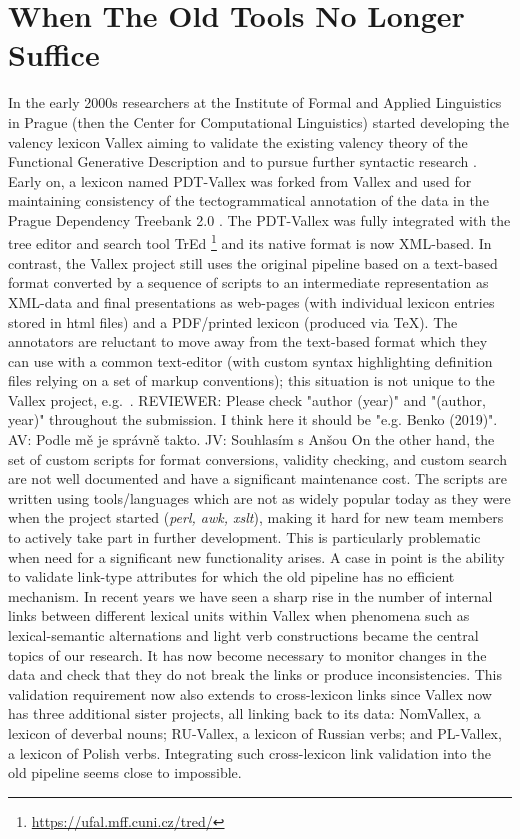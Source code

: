 \documentclass[10pt, a4paper]{article}
\newcommand{\av}[1]{{\color{ansa} AV: #1}}
\newcommand{\jv}[1]{{\color{svlinks} JV: #1}}
\newcommand{\rrr}[1]{{\color{red} REVIEWER: #1}}
\begin{document}
\section{When The Old Tools No Longer Suffice}\label{sec:history}
In the early 2000s researchers at the Institute of Formal and Applied Linguistics in Prague
(then the Center for Computational Linguistics) started developing the valency lexicon Vallex aiming to
validate the existing valency theory of the Functional Generative Description \cite{Panevova74verbal,Panevova75verbal,Panevova80formy,PanevovaSkoumalova92surface} and to pursue
further syntactic research \cite{LopatkovaEtAl02tektogramaticky}.
Early on, a lexicon named PDT-Vallex was forked from Vallex and used for
maintaining consistency of the tectogrammatical annotation of the data in the
Prague Dependency Treebank 2.0 \cite{PDT2.0,HajicHonetschlager03annotation}.
The PDT-Vallex was fully integrated with the tree editor and search tool TrEd%
\footnote{\url{https://ufal.mff.cuni.cz/tred/}}
\cite{PajasStepanek08recent}
and its native format is now XML-based.
In contrast,
the Vallex project still uses the original pipeline based on a text-based format
converted by a sequence of scripts to an intermediate representation as XML-data
\cite{Zabokrtsky05valency}
and final presentations as web-pages (with individual lexicon entries stored in html files)
and a PDF/printed lexicon (produced via TeX).
The annotators are reluctant to move away from the text-based format which they can use with a common text-editor
(with custom syntax highlighting definition files relying on a set of markup conventions);
this situation is not unique to the Vallex project, e.g.\ \cite{Benko19LexiCorp}.
\rrr{Please check "author (year)" and "(author, year)" throughout the submission. I think here it should be "e.g. Benko (2019)".}
\av{Podle mě je správně takto.}
\jv{Souhlasím s Anšou}
On the other hand, the set of custom scripts for format conversions,
validity checking, and custom search are not well documented and have a significant
maintenance cost.
The scripts are written using tools/languages which are not as widely
popular today as they were when the project started (\emph{perl, awk, xslt}),
making it hard for new team members to actively take part in further development.
This is particularly problematic when need for a significant new functionality arises. A case in point
is the ability to validate link-type attributes for which the old pipeline has no efficient mechanism.
In recent years we have seen a sharp rise in the number of internal links between different lexical units within Vallex  when phenomena such as lexical-semantic alternations and light verb constructions became the central topics of our research. It has now become necessary to monitor changes in the data and check that they do not break the links or produce inconsistencies. This validation requirement now also extends to cross-lexicon links
since Vallex now has three additional sister projects, all linking back to its data: NomVallex, a lexicon of deverbal nouns; RU-Vallex, a lexicon of Russian verbs; and PL-Vallex, a lexicon of Polish verbs. Integrating such
cross-lexicon link validation into the old pipeline seems close to impossible.
\end{document}
